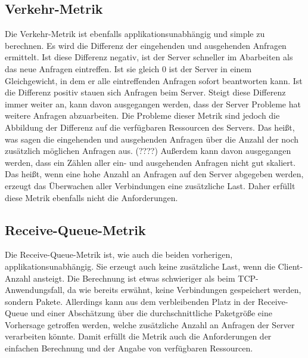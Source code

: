 \documentclass[a4paper, 12pt, BCOR10mm, DIV12, toc=bibliography, toc=listof, german]{scrbook}
\begin{document}
	
		\subsection*{Verkehr-Metrik} %

		Die Verkehr-Metrik ist ebenfalls applikationsunabhängig und simple zu berechnen. Es wird die
		Differenz der eingehenden und ausgehenden Anfragen ermittelt. Ist diese Differenz negativ, ist
		der Server schneller im Abarbeiten als das neue Anfragen eintreffen. Ist sie gleich 0 ist der
		Server in einem Gleichgewicht, in dem er alle eintreffenden Anfragen sofort beantworten kann.
		Ist die Differenz positiv stauen sich Anfragen beim Server. Steigt diese Differenz immer
		weiter an, kann davon ausgegangen werden, dass der Server Probleme hat weitere Anfragen
		abzuarbeiten. Die Probleme dieser Metrik sind jedoch die Abbildung der Differenz auf die
		verfügbaren Ressourcen des Servers. Das heißt, was sagen die eingehenden und ausgehenden Anfragen
		über die Anzahl der noch zusätzlich möglichen Anfragen aus. (????) Außerdem kann davon ausgegangen
		werden, dass ein Zählen aller ein- und ausgehenden Anfragen nicht gut skaliert. Das heißt, wenn
		eine hohe Anzahl an Anfragen auf den Server abgegeben werden, erzeugt das Überwachen aller
		Verbindungen eine zusätzliche Last. Daher erfüllt diese Metrik ebenfalls nicht die
		Anforderungen.
		

		\subsection*{Receive-Queue-Metrik} %

		Die Receive-Queue-Metrik ist, wie auch die beiden vorherigen, applikationsunabhängig. Sie
		erzeugt auch keine zusätzliche Last, wenn die Client-Anzahl ansteigt. Die Berechnung ist etwas
		schwieriger als beim TCP-Anwendungsfall, da wie bereits erwähnt, keine Verbindungen gespeichert
		werden, sondern Pakete. Allerdings kann aus dem verbleibenden Platz in der Receive-Queue und
		einer Abschätzung über die durchschnittliche Paketgröße eine Vorhersage getroffen werden, welche
		zusätzliche Anzahl an Anfragen der Server verarbeiten könnte. Damit erfüllt die Metrik auch die
		Anforderungen der einfachen Berechnung und der Angabe von verfügbaren Ressourcen.
		
\end{document}
